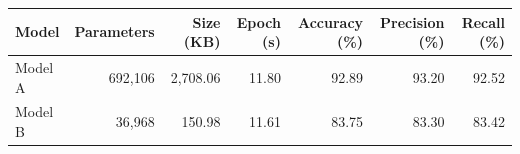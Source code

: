 \begin{tabular}{lrrrrrr}
\hline
Model & Parameters & Size (KB) & Epoch (s) & Accuracy (\%) & Precision (\%) & Recall (\%) \\
\hline
Model A & 692{,}106 & 2{,}708.06 & 11.80 & 92.89 & 93.20 & 92.52 \\
Model B & 36{,}968 & 150.98 & 11.61 & 83.75 & 83.30 & 83.42 \\
\hline
\end{tabular}
